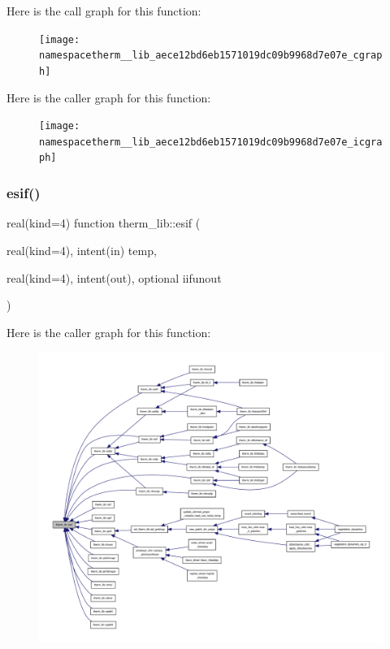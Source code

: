 Here is the call graph for this function\+:
\nopagebreak
\begin{figure}[H]
\begin{center}
\leavevmode
\texttt{[image: namespacetherm\_\_lib\_aece12bd6eb1571019dc09b9968d7e07e\_cgraph]}
\end{center}
\end{figure}
Here is the caller graph for this function\+:
\nopagebreak
\begin{figure}[H]
\begin{center}
\leavevmode
\texttt{[image: namespacetherm\_\_lib\_aece12bd6eb1571019dc09b9968d7e07e\_icgraph]}
\end{center}
\end{figure}
\mbox{\label{namespacetherm__lib_a109004866b1542dfcfa1da1e5130d3c9}} 
\subsubsection{\texorpdfstring{esif()}{esif()}}
{\footnotesize\ttfamily real(kind=4) function therm\+\_\+lib\+::esif (\begin{DoxyParamCaption}\item[{real(kind=4), intent(in)}]{temp,  }\item[{real(kind=4), intent(out), optional}]{iifunout }\end{DoxyParamCaption})}

Here is the caller graph for this function\+:
\nopagebreak
\begin{figure}[H]
\begin{center}
\leavevmode
\includegraphics[width=350pt]{namespacetherm__lib_a109004866b1542dfcfa1da1e5130d3c9_icgraph}
\end{center}
\end{figure}
\mbox{\label{namespacetherm__lib_a4c1f51941fe39db465e2fba15c887667}} 
